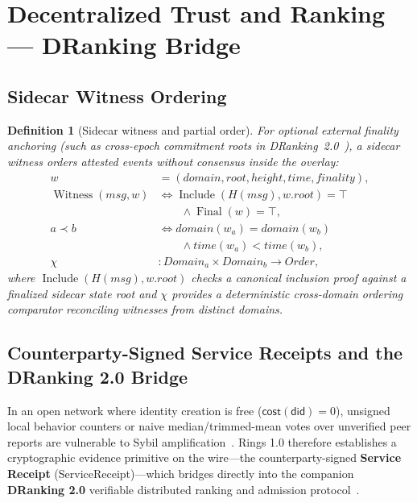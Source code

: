 \documentclass[journal]{IEEEtran}
\newtheorem{definition}{Definition}
\DeclareRobustCommand{\code}[1]{{\ttfamily\renewcommand{\_}{\textunderscore\allowbreak}#1}}
\begin{document}
\section{Decentralized Trust and Ranking --- DRanking Bridge}\label{sec:trust}

\subsection{Sidecar Witness Ordering}

\begin{definition}[Sidecar witness and partial order]
For optional external finality anchoring (such as cross-epoch commitment roots in DRanking~2.0~\cite{RingsDRanking2026}), a sidecar witness orders attested events without consensus inside the overlay:
\[
\begin{aligned}
  w &= (domain,root,height,time,finality),\\
  \operatorname{Witness}(msg,w) &\iff \operatorname{Include}(H(msg),w.root)=\top\\
  &\qquad\land\operatorname{Final}(w)=\top,\\
  a\prec b &\iff domain(w_a)=domain(w_b)\\
  &\qquad\land time(w_a)<time(w_b),\\
  \chi &: Domain_a\times Domain_b\to Order,
\end{aligned}
\]
where $\operatorname{Include}(H(msg),w.root)$ checks a canonical inclusion proof against a finalized sidecar state root and $\chi$ provides a deterministic cross-domain ordering comparator reconciling witnesses from distinct domains.
\end{definition}

\subsection{Counterparty-Signed Service Receipts and the DRanking 2.0 Bridge}

In an open network where identity creation is free ($\mathsf{cost}(\mathsf{did})=0$),
unsigned local behavior counters or naive median/trimmed-mean votes over unverified
peer reports are vulnerable to Sybil amplification~\cite{Douceur2002}.  Rings 1.0
therefore establishes a cryptographic evidence primitive on the wire---the
counterparty-signed \textbf{Service Receipt} (\code{ServiceReceipt})---which bridges
directly into the companion \textbf{DRanking 2.0} verifiable distributed ranking and
admission protocol~\cite{RingsDRanking2026}.
\end{document}
